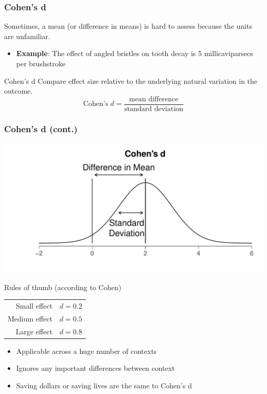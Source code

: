 \documentclass[12pt, block=fill]{beamer}
\begin{document}
\begin{frame}
  \frametitle{Cohen's d}
    Sometimes, a mean (or difference in means) is hard to assess because
  the units are unfamiliar.
  \begin{itemize}
  \item \textbf{Example}: The effect of angled bristles on tooth decay
    is 5 millicaviparsecs per
    brushstroke %
  \end{itemize}
  \begin{block}{Cohen's d} 
    Compare effect size relative to the underlying natural variation
    in the outcome.
    \[
      \text{Cohen's } d = \frac{\text{mean difference}}{\text{standard
          deviation}}
    \]
    \end{block} 
\end{frame}

\begin{frame}
  \frametitle{Cohen's d (cont.)}
  \begin{center}
  \includegraphics[width=\linewidth]{./figures/cohens_d.pdf}
  \end{center}
\end{frame} 

\begin{frame}
  \begin{block}{Rules of thumb (according to Cohen)}
    \begin{center}
      \begin{tabular}{rc}
        Small effect     & $d = 0.2$ \\ 
        Medium effect & $d = 0.5$ \\ 
        Large effect      & $d = 0.8$ \\
      \end{tabular}
    \end{center}
  \end{block} 
  \begin{itemize}
    \item Applicable across a huge number of contexts 
    \item Ignores any important differences between context 
    \item Saving dollars or saving lives are the same to Cohen's d
  \end{itemize} 
\end{frame}
\end{document}
